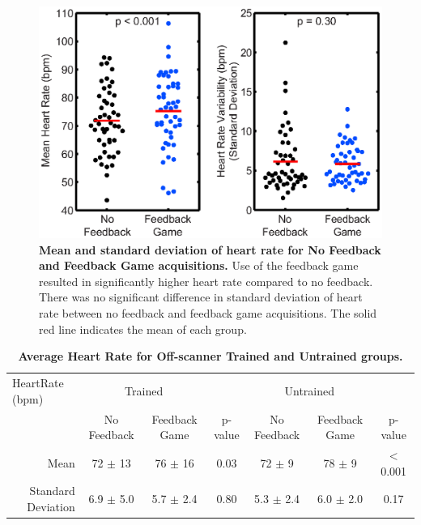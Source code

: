 	\begin{figure}
		\centering %
		\includegraphics{figures/gamepaper/06-AveHR_mean_stdDev}
		\caption[Mean and standard deviation of heart rate for No Feedback and Feedback Game acquisitions]{\textbf{Mean and standard deviation of heart rate for No Feedback and Feedback Game acquisitions.} Use of the feedback game resulted in significantly higher heart rate compared to no feedback. There was no significant difference in standard deviation of heart rate between no feedback and feedback game acquisitions. The solid red line indicates the mean of each group.}
		\label{fig:FG_heartrate}
	\end{figure}

	\begin{landscape}
	\begin{table}
		\centering
		\caption[Average Heart Rate for Off-scanner Trained and Untrained groups]{\textbf{Average Heart Rate for Off-scanner Trained and Untrained groups.}}
		\label{table:FG_HR}
		\begin{tabular}{ccccccc}
			\toprule
			\multicolumn{1}{l}{HeartRate (bpm)} & \multicolumn{2}{c}{Trained} & \multicolumn{1}{c}{} & \multicolumn{2}{c}{Untrained} & \multicolumn{1}{c}{}\\ 
			\multicolumn{1}{r}{} & \multicolumn{1}{c}{No Feedback} & \multicolumn{1}{c}{Feedback Game} & \multicolumn{1}{c}{p-value} & \multicolumn{1}{c}{No Feedback} & \multicolumn{1}{c}{Feedback Game} & \multicolumn{1}{c}{p-value} \\ \midrule
			\multicolumn{1}{r}{Mean} & \multicolumn{1}{c}{72 $\pm$ 13} & \multicolumn{1}{c}{76 $\pm$ 16} & \multicolumn{1}{c}{0.03} & \multicolumn{1}{c}{72 $\pm$ 9} & \multicolumn{1}{c}{78 $\pm$ 9} & \multicolumn{1}{c}{$<$ 0.001} \\
			\multicolumn{1}{r}{Standard Deviation} & \multicolumn{1}{c}{6.9 $\pm$ 5.0} & \multicolumn{1}{c}{5.7 $\pm$ 2.4} & \multicolumn{1}{c}{0.80} & \multicolumn{1}{c}{5.3 $\pm$ 2.4} & \multicolumn{1}{c}{6.0 $\pm$ 2.0} & \multicolumn{1}{c}{0.17} \\
			\bottomrule                                                 
		\end{tabular}
	\end{table}
	\end{landscape}

